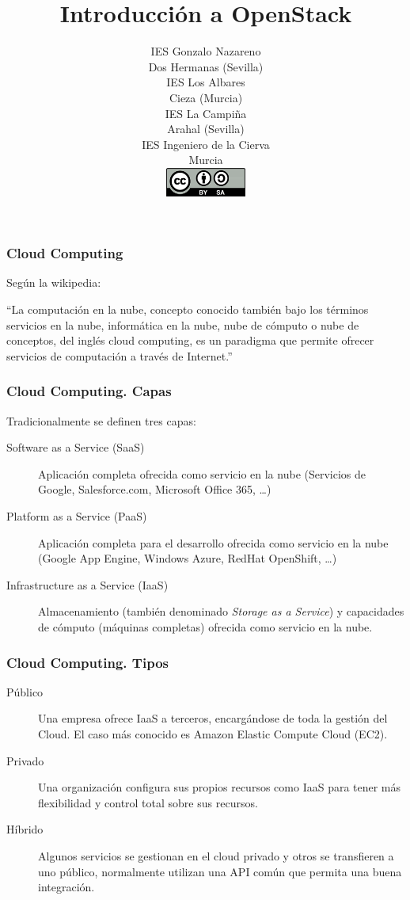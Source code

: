 \documentclass{beamer}
\author{
\small{IES Gonzalo Nazareno}\\
\tiny{Dos Hermanas (Sevilla)}\\
\small{IES Los Albares}\\
\tiny{Cieza (Murcia)}\\
\small{IES La Campiña}\\
\tiny{Arahal (Sevilla)}\\
\small{IES Ingeniero de la Cierva}\\
\tiny{Murcia}\\
\vspace{.5cm}
\includegraphics[width=0.2\textwidth]{cc_by_sa.png}}
\title{Introducción a OpenStack}
\institute{Proyecto de Innovación\\ {\color{white} .\\} \emph{Implantación y
    puesta a punto de la infraestructura de un cloud computing privado para el
    despliegue de servicios en la nube}}
\begin{document}
\setlength{\parskip}{.2cm}

\begin{frame}[t,plain]
\titlepage
\end{frame}

\begin{frame}
  \frametitle{Cloud Computing}
  Según la wikipedia:\par
  ``La computación en la nube, concepto conocido también bajo los términos
  servicios en la nube, informática en la nube, nube de cómputo o nube de
  conceptos, del inglés cloud computing, es un paradigma que permite ofrecer
  servicios de computación a través de Internet.''
\end{frame}

\begin{frame}
  \frametitle{Cloud Computing. Capas}
  Tradicionalmente se definen tres capas:
  \begin{description}
  \item[Software as a Service (SaaS)] Aplicación completa ofrecida
    como servicio en la nube (Servicios de Google, Salesforce.com, Microsoft
    Office 365, \ldots)
  \item[Platform as a Service (PaaS)] Aplicación completa para el
    desarrollo ofrecida como servicio en la nube (Google App Engine,
    Windows Azure, RedHat OpenShift, \ldots)
  \item[Infrastructure as a Service (IaaS)] Almacenamiento (también
    denominado \textit{Storage as a Service}) y capacidades de cómputo
    (máquinas completas) ofrecida como servicio en la nube.
  \end{description}
\end{frame}

\begin{frame}
  \frametitle{Cloud Computing. Tipos}
  \begin{description}
  \item[Público] Una empresa ofrece IaaS a terceros, encargándose de
    toda la gestión del Cloud. El caso más conocido es Amazon Elastic
    Compute Cloud (EC2).
  \item[Privado] Una organización configura sus propios recursos como
    IaaS para tener más flexibilidad y control total sobre sus
    recursos.
  \item[Híbrido] Algunos servicios se gestionan en el cloud privado y
    otros se transfieren a uno público, normalmente utilizan una API
    común que permita una buena integración.
  \end{description}
\end{frame}
\end{document}

